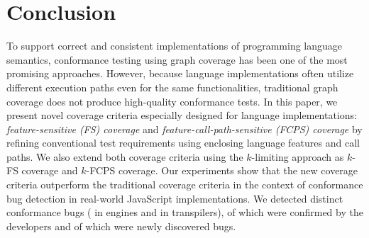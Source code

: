 \section{Conclusion}\label{sec:conclusion}
To support correct and consistent implementations of programming language semantics,
conformance testing using graph coverage has been one of the most
promising approaches. However, because language implementations often utilize 
different execution paths even for the same functionalities,
traditional graph coverage does not produce high-quality conformance tests.
In this paper, we present novel coverage criteria especially designed
for language implementations: \textit{feature-sensitive (FS) coverage} and
\textit{feature-call-path-sensitive (FCPS) coverage}
by refining conventional test requirements using
enclosing language features and call paths.
We also extend both coverage criteria using the $k$-limiting approach as
$k$-FS coverage and $k$-FCPS coverage.
Our experiments show that the new coverage criteria outperform the
traditional coverage criteria in the context of conformance bug detection in
real-world JavaScript implementations.
We detected  distinct conformance bugs ( in engines
and  in transpilers),  of which were confirmed by the
developers and  of which were newly discovered bugs.
